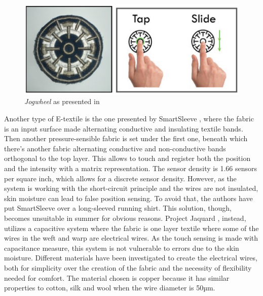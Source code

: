 \documentclass{sigchi}
\begin{document}
\begin{figure}
  \includegraphics[width=\columnwidth]{jogwheel.png}
  \caption{\emph{Jogwheel} as presented in \protect\cite{touch-wrist}}
  \label{fig:1}
\end{figure}
%
%
Another type of E-textile is the one presented by SmartSleeve \cite{smart-sleeve}, where the fabric is an input surface made alternating conductive and insulating textile bands. Then another pressure-sensible fabric is set under the first one, beneath which there’s another fabric alternating conductive and non-conductive bands  orthogonal to the top layer. This allows to touch and register both the position and the intensity with a matrix representation. The sensor density is 1.66 sensors per square inch, which allows for a discrete sensor density. However, as the system is working with the short-circuit principle and the wires are not insulated, skin moisture can lead to false position sensing. To avoid that, the authors have put SmartSleeve over a long-sleeved running shirt. This solution, though, becomes unsuitable in summer for obvious reasons. %
%
Project Jaquard \cite{jacquard}, instead, utilizes a capacitive system where the fabric is one layer textile where some of the wires in the weft and warp are electrical wires. As the touch sensing is made with capacitance measure, this system is not vulnerable to errors due to the skin moisture. Different materials have been investigated to create the electrical wires, both for simplicity over the creation of the fabric and the necessity of flexibility needed for comfort. The material chosen is copper because it has similar properties to cotton, silk and wool when the wire diameter is 50µm.
%
\end{document}
